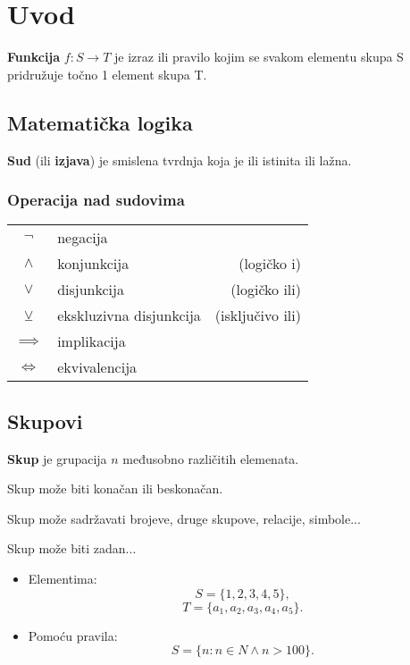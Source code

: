 \section{Uvod}

\begin{definition}[funkcija]
    \textbf{Funkcija} $f: S \to T$ je izraz ili pravilo kojim se svakom elementu skupa S
    pridružuje točno 1 element skupa T.
\end{definition}

\subsection{Matematička logika}

\begin{definition}
    \textbf{Sud} (ili \textbf{izjava}) je smislena tvrdnja koja je ili istinita ili lažna.
\end{definition}

\subsubsection{Operacija nad sudovima}

\begin{tabular}{c|lr}
    $\neg$ & negacija &\\
    $\wedge$ & konjunkcija &(logičko i) \\
    $\vee$ & disjunkcija &(logičko ili) \\
    $\veebar$ & ekskluzivna disjunkcija &(isključivo ili) \\
    $\implies$ & implikacija &\\
    $\Leftrightarrow$ & ekvivalencija &\\
\end{tabular}

\subsection{Skupovi}

\begin{definition}
    \textbf{Skup} je grupacija $n$ međusobno različitih elemenata.
    
    Skup može biti konačan ili beskonačan.
    
    Skup može sadržavati brojeve, druge skupove, relacije, simbole...
\end{definition}

Skup može biti zadan...
\begin{itemize}
    \item Elementima:
        $$S = \{1, 2, 3, 4, 5\},$$
        $$T = \{a_1, a_2, a_3, a_4, a_5\}.$$
    \item Pomoću pravila:
        $$S = \{n: n \in N \land n > 100\}.$$
\end{itemize}

